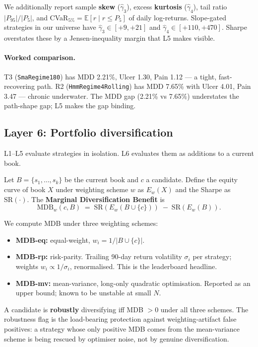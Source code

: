 \documentclass[11pt]{article}
\begin{document}
We additionally report sample \textbf{skew} ($\hat{\gamma}_3$), excess
\textbf{kurtosis} ($\hat{\gamma}_4$), tail ratio
$|P_{95}|/|P_5|$, and CVaR$_{5\%} = \mathbb{E}[r \mid r \leq P_5]$ of daily
log-returns. Slope-gated strategies in our universe have $\hat{\gamma}_3 \in
[+9, +21]$ and $\hat{\gamma}_4 \in [+110, +470]$. Sharpe overstates these by
a Jensen-inequality margin that L5 makes visible.

\paragraph{Worked comparison.} T3 (\texttt{SmaRegime180}) has MDD 2.21\%,
Ulcer 1.30, Pain 1.12 --- a tight, fast-recovering path. R2
(\texttt{HmmRegime4Rolling}) has MDD 7.65\% with Ulcer 4.01, Pain 3.47 ---
chronic underwater. The MDD gap (2.21\% vs 7.65\%) understates the path-shape
gap; L5 makes the gap binding.

\subsection{Layer 6: Portfolio diversification}
\label{sec:l6}

L1--L5 evaluate strategies in isolation. L6 evaluates them as additions to a
current book.

Let $B = \{s_1, \ldots, s_k\}$ be the current book and $c$ a candidate.
Define the equity curve of book $X$ under weighting scheme $w$ as
$E_w(X)$ and the Sharpe as $\mathrm{SR}(\cdot)$. The
\textbf{Marginal Diversification Benefit} is
\begin{equation}
\mathrm{MDB}_w(c, B) \;=\; \mathrm{SR}(E_w(B \cup \{c\})) \;-\; \mathrm{SR}(E_w(B)).
\end{equation}

We compute MDB under three weighting schemes:
\begin{itemize}
  \item \textbf{MDB-eq:} equal-weight, $w_i = 1/|B \cup \{c\}|$.
  \item \textbf{MDB-rp:} risk-parity. Trailing 90-day return volatility
        $\sigma_i$ per strategy; weights $w_i \propto 1/\sigma_i$, renormalised.
        This is the leaderboard headline.
  \item \textbf{MDB-mv:} mean-variance, long-only quadratic optimisation.
        Reported as an upper bound; known to be unstable at small $N$.
\end{itemize}

A candidate is \textbf{robustly} diversifying iff MDB $> 0$ under all three
schemes. The robustness flag is the load-bearing protection against
weighting-artifact false positives: a strategy whose only positive MDB comes
from the mean-variance scheme is being rescued by optimiser noise, not by
genuine diversification.
\end{document}
